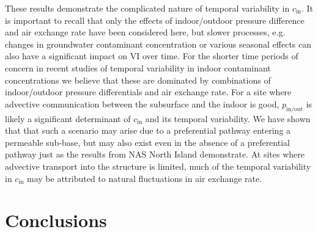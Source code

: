 \documentclass[preprint,12pt]{elsarticle}
\begin{document}
These results demonstrate the complicated nature of temporal variability in $c_\mathrm{in}$.
It is important to recall that only the effects of indoor/outdoor pressure difference and air exchange rate have been considered here, but slower processes, e.g. changes in groundwater contaminant concentration or various seasonal effects can also have a significant impact on VI over time.
For the shorter time periods of concern in recent studies of temporal variability in indoor contaminant concentrations we believe that these are dominated by combinations of indoor/outdoor pressure differentials and air exchange rate.
For a site where advective communication between the subsurface and the indoor is good, $p_\mathrm{in/out}$ is likely a significant determinant of $c_\mathrm{in}$ and its temporal variability.
We have shown that that such a scenario may arise due to a preferential pathway entering a permeable sub-base, but may also exist even in the absence of a preferential pathway just as the results from NAS North Island demonstrate.
At sites where advective transport into the structure is limited, much of the temporal variability in $c_\mathrm{in}$ may be attributed to natural fluctuations in air exchange rate.\par


\section{Conclusions}
\end{document}
